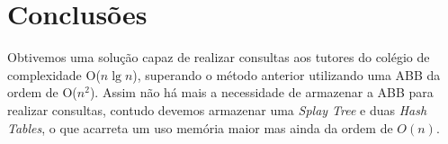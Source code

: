 \section{Conclusões}
\label{sec:conc}
Obtivemos uma solução capaz de realizar consultas aos tutores do colégio de
complexidade O($n \lg n$), superando o método anterior utilizando uma ABB da ordem de O($n^2$).
Assim não há mais a necessidade de armazenar a ABB para
realizar consultas, contudo devemos armazenar uma \textit{Splay Tree} e duas \textit{Hash Tables}, o que acarreta um uso memória maior mas ainda da ordem de $O(n)$.